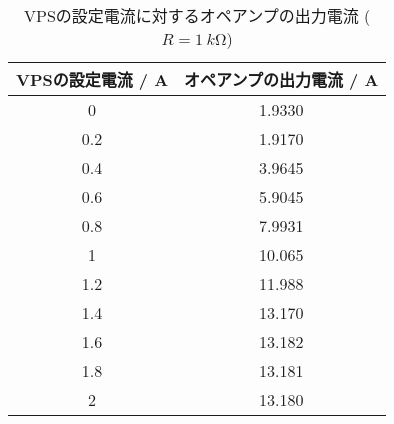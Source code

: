 \begin{table}[!htp]\centering
	\caption{VPSの設定電流に対するオペアンプの出力電流 ($R=\SI{1}{k\ohm}$)}\label{tab:exp3-1k}
	\scriptsize
	\begin{tabular}{cc}\toprule
		VPSの設定電流 / A & オペアンプの出力電流 / A \\\midrule
		0            & 1.9330         \\
		0.2          & 1.9170         \\
		0.4          & 3.9645         \\
		0.6          & 5.9045         \\
		0.8          & 7.9931         \\
		1            & 10.065         \\
		1.2          & 11.988         \\
		1.4          & 13.170         \\
		1.6          & 13.182         \\
		1.8          & 13.181         \\
		2            & 13.180         \\
		\bottomrule
	\end{tabular}
\end{table}
